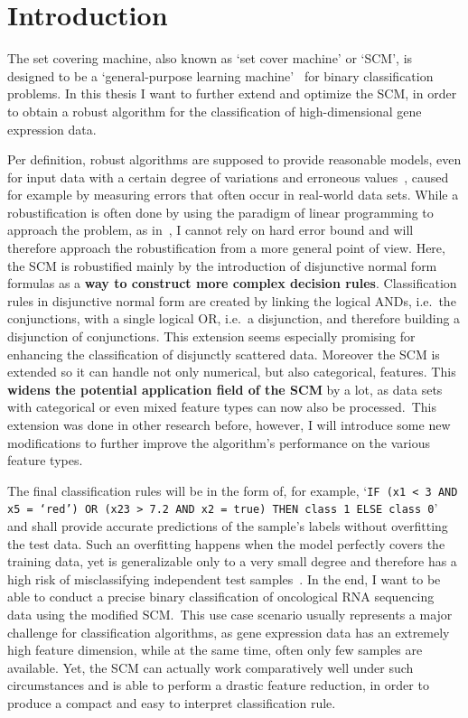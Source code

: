 \chapter{Introduction}\label{ch:introduction}

The set covering machine, also known as `set cover machine' or `SCM', is designed to be a `general-purpose learning machine'~\citep[p.727]{marchand02}
for binary classification problems.
In this thesis I want to further extend and optimize the SCM, in order to obtain a robust algorithm for the classification of high-dimensional gene expression data.

Per definition, robust algorithms are supposed to provide reasonable models,
even for input data with a certain degree of variations and erroneous values~\citep{burgard},
caused for example by measuring errors that often occur in real-world data sets.
While a robustification is often done by using the paradigm of linear programming to approach the problem, as in~\cite{hussain},
I cannot rely on hard error bound and will therefore approach the robustification from a more general point of view.
Here, the SCM is robustified mainly by the introduction of disjunctive normal form formulas as a
\textbf{way to construct more complex decision rules}.
Classification rules in disjunctive normal form are created by linking the logical ANDs, i.e.\ the conjunctions, with a single logical OR, i.e.\ a disjunction,
and therefore building a disjunction of conjunctions.
This extension seems especially promising for enhancing the classification of disjunctly scattered data.
Moreover the SCM is extended so it can handle not only numerical, but also categorical, features.
This \textbf{widens the potential application field of the SCM} by a lot, as data sets with categorical or even mixed
feature types can now also be processed.\
This extension was done in other research before, however, I will introduce some new modifications to further improve
the algorithm's performance on the various feature types.

The final classification rules will be in the form of, for example, `\texttt{IF (x1 < 3 AND x5 = `red') OR (x23 > 7.2 AND x2 = true) THEN class 1 ELSE class 0}'\\
and shall provide accurate predictions of the sample's labels without overfitting the test data.
Such an overfitting happens when the model perfectly covers the training data, yet is generalizable only
to a very small degree and therefore has a high risk of misclassifying independent test samples~\citep{drouin16}.
In the end, I want to be able to conduct a precise binary classification of oncological RNA sequencing data using the modified SCM.\
This use case scenario usually represents a major challenge for classification algorithms, as
gene expression data has an extremely high feature dimension, while at the same time, often only few samples are available.
Yet, the SCM can actually work comparatively well under such circumstances
and is able to perform a drastic feature reduction, in order to produce a compact and easy to interpret classification rule.

